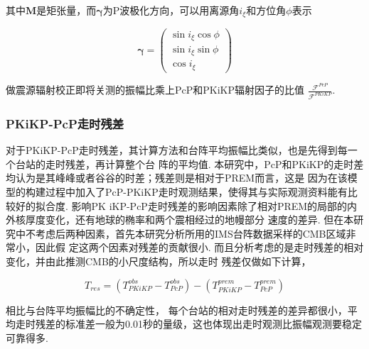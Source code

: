 其中$\bm{M}$是矩张量，而$\bm{\gamma}$为P波极化方向，可以用离源角$i_{\xi}$和方位角$\phi$表示

\begin{equation}
\bm{\gamma} = \left(\begin{array}{c}
\sin i_{\xi} \cos \phi \\
\sin i_{\xi} \sin \phi \\
\cos i_{\xi}
\end{array}\right)
\end{equation}

做震源辐射校正即将关测的振幅比乘上PcP和PKiKP辐射因子的比值%
$\frac{\mathcal{F}^{PcP}}{\mathcal{F}^{PKiKP}}$. 

\subsubsection{PKiKP-PcP走时残差}

对于PKiKP-PcP走时残差，其计算方法和台阵平均振幅比类似，也是先得到每一个台站的走时残差，再计算整个台
阵的平均值. 本研究中，PcP和PKiKP的走时差均认为是其峰峰或者谷谷的时差；残差则是相对于PREM而言，这是
因为在该模型的构建过程中加入了PcP-PKiKP走时观测结果，使得其与实际观测资料能有比较好的拟合度. 影响PK
iKP-PcP走时残差的影响因素除了相对PREM的局部的内外核厚度变化，还有地球的椭率和两个震相经过的地幔部分
速度的差异. 但在本研究中不考虑后两种因素，首先本研究分析所用的IMS台阵数据采样的CMB区域非常小，因此假
定这两个因素对残差的贡献很小. 而且分析考虑的是走时残差的相对变化，并由此推测CMB的小尺度结构，所以走时
残差仅做如下计算，

\begin{equation} T_{res} = (T_{PKiKP}^{obs} - T_{PcP}^{obs}) - (T_{PKiKP}^{prem} - T_{PcP}^{prem})
\end{equation}

相比与台阵平均振幅比的不确定性， 每个台站的相对走时残差的差异都很小，平均走时残差的标准差一般为0.01秒的量级，这也体现出走时观测比振幅观测要稳定可靠得多. 